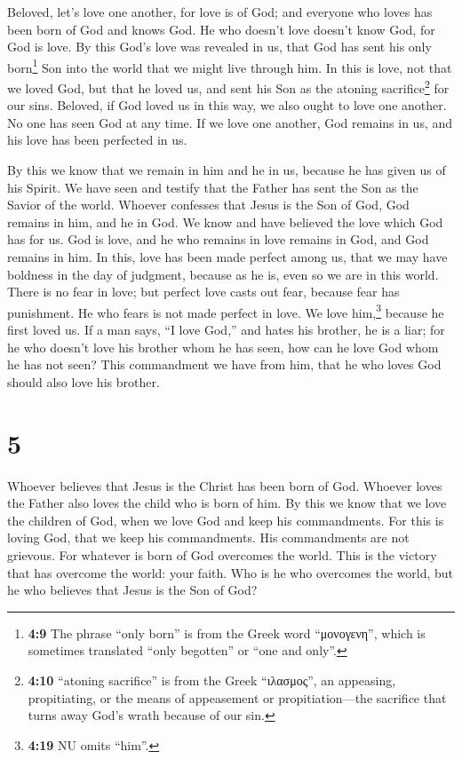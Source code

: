  Beloved, let's love one another, for love is of God; and
everyone who loves has been born of God and knows God.  He
who doesn't love doesn't know God, for God is love.  By
this God's love was revealed in us, that God has sent his only
born\footnote{\textbf{4:9} The phrase ``only born'' is from the Greek
  word ``μονογενη'', which is sometimes translated ``only begotten'' or
  ``one and only''.} Son into the world that we might live through him.
 In this is love, not that we loved God, but that he
loved us, and sent his Son as the atoning sacrifice\footnote{\textbf{4:10}
  ``atoning sacrifice'' is from the Greek ``ιλασμος'', an appeasing,
  propitiating, or the means of appeasement or propitiation---the
  sacrifice that turns away God's wrath because of our sin.} for our
sins.  Beloved, if God loved us in this way, we also
ought to love one another.  No one has seen God at any
time. If we love one another, God remains in us, and his love has been
perfected in us.

 By this we know that we remain in him and he in us,
because he has given us of his Spirit.  We have seen and
testify that the Father has sent the Son as the Savior of the world.
 Whoever confesses that Jesus is the Son of God, God
remains in him, and he in God.  We know and have believed
the love which God has for us. God is love, and he who remains in love
remains in God, and God remains in him.  In this, love
has been made perfect among us, that we may have boldness in the day of
judgment, because as he is, even so we are in this world.
 There is no fear in love; but perfect love casts out
fear, because fear has punishment. He who fears is not made perfect in
love.  We love him,\footnote{\textbf{4:19} NU omits
  ``him''.} because he first loved us.  If a man says,
``I love God,'' and hates his brother, he is a liar; for he who doesn't
love his brother whom he has seen, how can he love God whom he has not
seen?  This commandment we have from him, that he who
loves God should also love his brother.

\hypertarget{section-4}{%
\section{5}\label{section-4}}

 Whoever believes that Jesus is the Christ has been born
of God. Whoever loves the Father also loves the child who is born of
him.  By this we know that we love the children of God,
when we love God and keep his commandments.  For this is
loving God, that we keep his commandments. His commandments are not
grievous.  For whatever is born of God overcomes the
world. This is the victory that has overcome the world: your faith.
 Who is he who overcomes the world, but he who believes
that Jesus is the Son of God?

